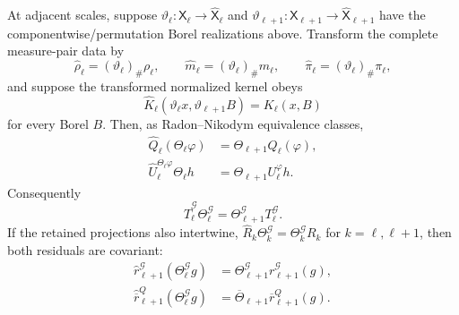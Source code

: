 At adjacent scales, suppose
\(\vartheta_\ell:\mathsf X_\ell\to\widehat{\mathsf X}_\ell\) and
\(\vartheta_{\ell+1}:\mathsf X_{\ell+1}\to
\widehat{\mathsf X}_{\ell+1}\) have the componentwise/permutation Borel
realizations above.  Transform the complete measure-pair data by
\begin{equation}
 \widehat\rho_\ell=(\vartheta_\ell)_\#\rho_\ell,\qquad
 \widehat m_\ell=(\vartheta_\ell)_\#m_\ell,\qquad
 \widehat\pi_\ell=(\vartheta_\ell)_\#\pi_\ell,
 \label{eq:rg-interaction-transformed-measure-pair}
\end{equation}
and suppose the transformed normalized kernel obeys
\begin{equation}
 \widehat K_\ell(\vartheta_\ell x,\vartheta_{\ell+1}B)
 =K_\ell(x,B)
 \label{eq:rg-interaction-kernel-gauge-covariance}
\end{equation}
for every Borel \(B\).
Then, as Radon--Nikodym equivalence classes,
\begin{align}
 \widehat Q_\ell(\Theta_\ell\varphi)
 &=\Theta_{\ell+1}Q_\ell(\varphi),
 \label{eq:rg-action-rn-gauge-covariance}\\
 \widehat U_\ell^{\Theta_\ell\varphi}\Theta_\ell h
 &=\Theta_{\ell+1}U_\ell^\varphi h.
 \label{eq:rg-tilted-derivative-gauge-covariance}
\end{align}
Consequently
\begin{equation}
 \widehat T_\ell^{\mathcal G}\Theta_\ell^{\mathcal G}
 =\Theta_{\ell+1}^{\mathcal G}T_\ell^{\mathcal G}.
 \label{eq:rg-nonlinear-interaction-gauge-covariance}
\end{equation}
If the retained projections also intertwine,
\(\widehat R_k\Theta_k^{\mathcal G}
=\Theta_k^{\mathcal G}R_k\) for \(k=\ell,\ell+1\), then both residuals
are covariant:
\begin{align}
 \widehat r_{\ell+1}^{\mathcal G}
   (\Theta_\ell^{\mathcal G}g)
 &=\Theta_{\ell+1}^{\mathcal G}r_{\ell+1}^{\mathcal G}(g),
 \label{eq:rg-coordinate-residual-gauge-covariance}\\
 \widehat{\overline r}_{\ell+1}^{Q}
   (\Theta_\ell^{\mathcal G}g)
 &=\overline\Theta_{\ell+1}\overline r_{\ell+1}^{Q}(g).
 \label{eq:rg-action-residual-gauge-covariance}
\end{align}

